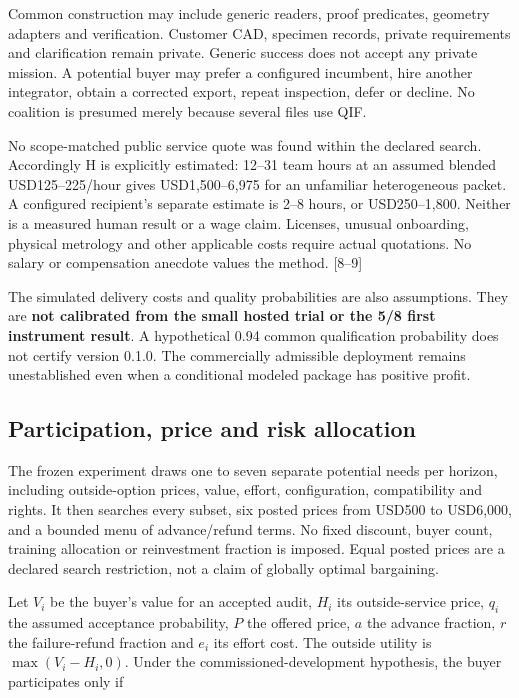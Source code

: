 \documentclass[
  11pt,
]{article}
\let\OriginalSubsection\subsection
\renewcommand{\subsection}{\needspace{6\baselineskip}\OriginalSubsection}
\begin{document}
Common construction may include generic readers, proof predicates,
geometry adapters and verification. Customer CAD, specimen records,
private requirements and clarification remain private. Generic success
does not accept any private mission. A potential buyer may prefer a
configured incumbent, hire another integrator, obtain a corrected
export, repeat inspection, defer or decline. No coalition is presumed
merely because several files use QIF.

No scope-matched public service quote was found within the declared
search. Accordingly H is explicitly estimated: 12--31 team hours at an
assumed blended USD125--225/hour gives USD1,500--6,975 for an unfamiliar
heterogeneous packet. A configured recipient's separate estimate is 2--8
hours, or USD250--1,800. Neither is a measured human result or a wage
claim. Licenses, unusual onboarding, physical metrology and other
applicable costs require actual quotations. No salary or compensation
anecdote values the method. {[}8--9{]}

The simulated delivery costs and quality probabilities are also
assumptions. They are \textbf{not calibrated from the small hosted trial
or the 5/8 first instrument result}. A hypothetical 0.94 common
qualification probability does not certify version 0.1.0. The
commercially admissible deployment remains unestablished even when a
conditional modeled package has positive profit.

\hypertarget{participation-price-and-risk-allocation}{%
\subsection{Participation, price and risk
allocation}\label{participation-price-and-risk-allocation}}

The frozen experiment draws one to seven separate potential needs per
horizon, including outside-option prices, value, effort, configuration,
compatibility and rights. It then searches every subset, six posted
prices from USD500 to USD6,000, and a bounded menu of advance/refund
terms. No fixed discount, buyer count, training allocation or
reinvestment fraction is imposed. Equal posted prices are a declared
search restriction, not a claim of globally optimal bargaining.

Let \(V_i\) be the buyer's value for an accepted audit, \(H_i\) its
outside-service price, \(q_i\) the assumed acceptance probability, \(P\)
the offered price, \(a\) the advance fraction, \(r\) the failure-refund
fraction and \(e_i\) its effort cost. The outside utility is
\(\max(V_i-H_i,0)\). Under the commissioned-development hypothesis, the
buyer participates only if
\end{document}
